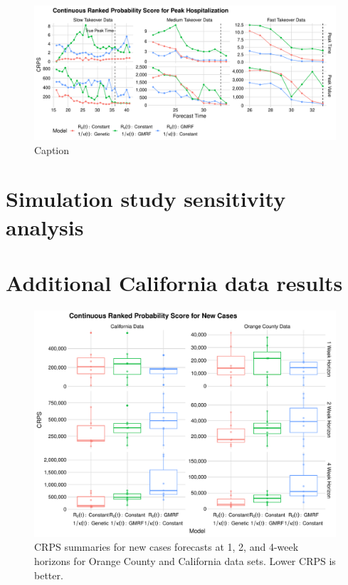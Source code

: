 \begin{figure}
    \centering
    \includegraphics[width=1.0\columnwidth]{simulated_peak_crps_plot}
    \caption{Caption}
    \label{ch_5:fig:simulated_peak_crps_plot}
\end{figure}

\section{Simulation study sensitivity analysis}
\label{ch_5:sec:sim_sensitivity}

\section{Additional California data results}

\begin{figure}
    \centering
    \includegraphics[width=1.0\columnwidth]{real_data_crps_comparison_boxplot_data_new_cases_plot}
    \caption[CRPS summaries for new cases forecasts for real data sets.]{CRPS summaries for new cases forecasts at 1, 2, and 4-week horizons for Orange County and California data sets. Lower CRPS is better.}
    \label{ch_5:fig:real_data_crps_comparison_boxplot_data_new_cases_plot}
\end{figure}

